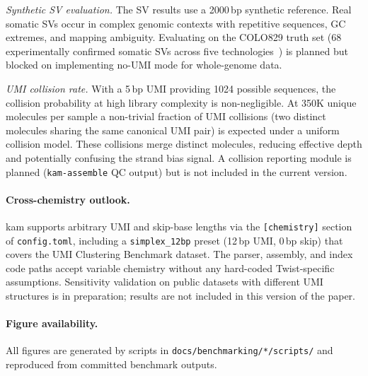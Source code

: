 \textit{Synthetic SV evaluation.}
The SV results use a 2000\,bp synthetic reference.
Real somatic SVs occur in complex genomic contexts with repetitive sequences,
GC extremes, and mapping ambiguity.
Evaluating on the COLO829 truth set (68 experimentally confirmed somatic SVs
across five technologies~\autocite{vanDijk22colo829}) is planned but blocked on
implementing no-UMI mode for whole-genome data.

\textit{UMI collision rate.}
With a 5\,bp UMI providing 1024 possible sequences, the collision probability
at high library complexity is non-negligible.
At 350K unique molecules per sample a non-trivial fraction of UMI collisions
(two distinct molecules sharing the same canonical UMI pair) is expected under
a uniform collision model.
These collisions merge distinct molecules, reducing effective depth and
potentially confusing the strand bias signal.
A collision reporting module is planned (\texttt{kam-assemble} QC output) but
is not included in the current version.

\paragraph{Cross-chemistry outlook.}
kam supports arbitrary UMI and skip-base lengths via the \texttt{[chemistry]}
section of \texttt{config.toml}, including a \texttt{simplex\_12bp} preset
(12\,bp UMI, 0\,bp skip) that covers the UMI Clustering Benchmark dataset.
The parser, assembly, and index code paths accept variable chemistry without
any hard-coded Twist-specific assumptions.
Sensitivity validation on public datasets with different UMI structures is
in preparation; results are not included in this version of the paper.

\paragraph{Figure availability.}
All figures are generated by scripts in \texttt{docs/benchmarking/*/scripts/}
and reproduced from committed benchmark outputs.

